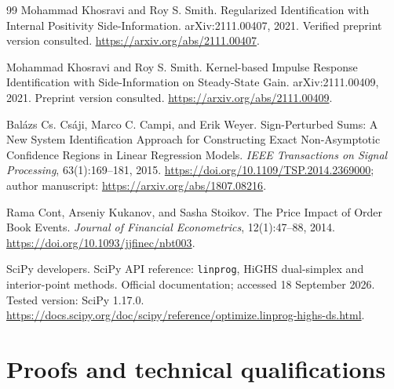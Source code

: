 \documentclass[11pt,a4paper]{article}
\theoremstyle{definition}
\theoremstyle{remark}
\begin{document}
\begin{thebibliography}{99}
Mohammad Khosravi and Roy S. Smith.
\newblock Regularized Identification with Internal Positivity Side-Information.
\newblock arXiv:2111.00407, 2021. Verified preprint version consulted.
\newblock \url{https://arxiv.org/abs/2111.00407}.

Mohammad Khosravi and Roy S. Smith.
\newblock Kernel-based Impulse Response Identification with Side-Information on Steady-State Gain.
\newblock arXiv:2111.00409, 2021. Preprint version consulted.
\newblock \url{https://arxiv.org/abs/2111.00409}.

Bal\'azs Cs. Cs\'aji, Marco C. Campi, and Erik Weyer.
\newblock Sign-Perturbed Sums: A New System Identification Approach for Constructing Exact Non-Asymptotic Confidence Regions in Linear Regression Models.
\newblock \emph{IEEE Transactions on Signal Processing}, 63(1):169--181, 2015.
\newblock \url{https://doi.org/10.1109/TSP.2014.2369000}; author manuscript: \url{https://arxiv.org/abs/1807.08216}.

Rama Cont, Arseniy Kukanov, and Sasha Stoikov.
\newblock The Price Impact of Order Book Events.
\newblock \emph{Journal of Financial Econometrics}, 12(1):47--88, 2014.
\newblock \url{https://doi.org/10.1093/jjfinec/nbt003}.

SciPy developers.
\newblock SciPy API reference: \texttt{linprog}, HiGHS dual-simplex and interior-point methods.
\newblock Official documentation; accessed 18 September 2026. Tested version: SciPy 1.17.0.
\newblock \url{https://docs.scipy.org/doc/scipy/reference/optimize.linprog-highs-ds.html}.
\end{thebibliography}
\endgroup

\clearpage
\appendix
\section{Proofs and technical qualifications}
\label{app:proofs}
\end{document}
